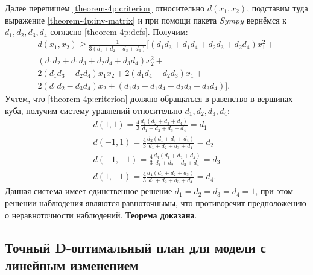 	Далее перепишем \eqref{theorem-4p:criterion} относительно $d(x_1, x_2)$, подставим туда выражение \eqref{theorem-4p:inv-matrix} и при помощи пакета \textit{Sympy} вернёмся к $d_1, d_2, d_3, d_4$ согласно \eqref{theorem-4p:defs}. Получим:
	\begin{gather*}
		d(x_1, x_2) \ge \frac 1 {3 (d_1 + d_2 + d_3 + d_4)} 
		[ 
			(d_1 d_3 + d_1 d_4 + d_2 d_3 + d_2 d_4) x_1^2 + \\
			(d_1 d_2 + d_1 d_3 + d_2 d_4 + d_3 d_4) x_2^2 + \\
			2 (d_1 d_3 - d_2 d_4) x_1 x_2 +
			2 (d_1 d_4 - d_2 d_3) x_1 + \\
			2 (d_1 d_2 - d_3 d_4) x_2 +
			(d_1 d_2 + d_1 d_4 + d_2 d_3 + d_3 d_4)
		].
	\end{gather*}
	Учтем, что \eqref{theorem-4p:criterion} должно обращаться в равенство в вершинах куба, получим систему уравнений относительно $d_1, d_2, d_3, d_4$:
	\begin{gather*}
		d(1, 1) = \frac 4 3 \frac {d_1 (d_2 + d_3 + d_4)} {d_1 + d_2 + d_3 + d_4} = d_1 \\
		d(-1, 1) = \frac 4 3 \frac {d_2(d_1 + d_3 + d_4)} {d_1 + d_2 + d_3 + d_4} = d_2 \\
		d(-1, -1) = \frac 4 3 \frac {d_3 (d_1 + d_2 + d_4)} {d_1 + d_2 + d_3 + d_4} = d_3 \\
		d(1, -1) = \frac 4 3 \frac {d_4 (d_1 + d_2 + d_3)} {d_1 + d_2 + d_3 + d_4} = d_4.
	\end{gather*}
	Данная система имеет единственное решение $d_1 = d_2 = d_3 = d_ 4 = 1$, при этом решении наблюдения являются равноточнымы, что противоречит предположению о неравноточности наблюдений.
	\textbf{Теорема доказана}.
	
\subsection{Точный D-оптимальный план для модели с линейным изменением}
	
